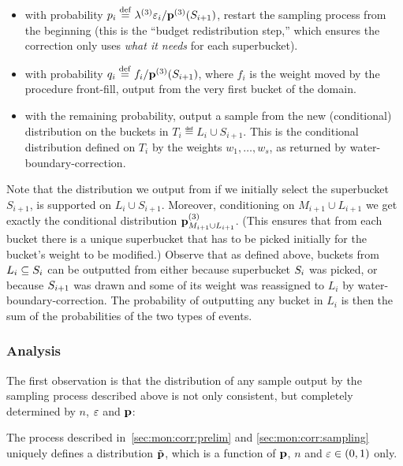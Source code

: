 \begin{itemize}
{\begin{itemize}
  \item with probability $p_i\stackrel{\rm def}{=}\lambda^{(3)}\varepsilon_i/\mathbf{p}^{(3)}(S_{i+1})$, restart the sampling process from the beginning (this is the ``budget redistribution step,'' which ensures the correction only uses \emph{what it needs} for each superbucket).
  \item with probability  $q_i\stackrel{\rm def}{=} f_i/\mathbf{p}^{(3)}(S_{i+1})$, where $f_i$ is the weight moved by the procedure \textsf{front-fill}, output {from} the very first {bucket} of the domain.      
    \item {with the remaining probability, output a sample from the new (conditional) distribution on the buckets in $T_i\eqdef L_i\cup S_{i+1}$. This is the conditional distribution defined {on $T_i$  by the weights $w_1,\dots, w_s$, as returned by} \textsf{water-boundary-correction}.}
  \end{itemize}
      } 
\end{itemize}
Note that the distribution we output from if we initially select the superbucket $S_{i+1}$, is supported on $L_i\cup S_{i+1}$. Moreover, conditioning on $M_{i+1}\cup L_{i+1}$ we get exactly the conditional distribution $\mathbf{p}^{(3)}_{M_{i+1}\cup {L_{i+1}}}$. (This ensures that from each bucket there is a unique superbucket that has to be picked initially for the bucket's weight to be modified.) {Observe that as defined above, buckets from $L_i\subseteq S_i$ can be outputted from either because superbucket $S_i$ was picked, or because $S_{i+1}$ was drawn and some of its weight was reassigned to $L_i$ by \textsf{water-boundary-correction}. The probability of outputting any bucket in $L_i$ is then the sum of the probabilities of the two types of events.} 



\subsubsection{Analysis}

The first observation is that the distribution of any sample output by the sampling process described above is not only consistent, but completely determined by $n$, $\varepsilon$ and $\mathbf{p}$:
\begin{claim}\label{lemma:correct:waterfill:defined}
The process described in~\cref{sec:mon:corr:prelim} and \ref{sec:mon:corr:sampling} uniquely defines a distribution $\tilde{\mathbf{p}}$, which is a function of $\mathbf{p}$, $n$ and $\varepsilon\in(0,1)$ only.
\end{claim}

